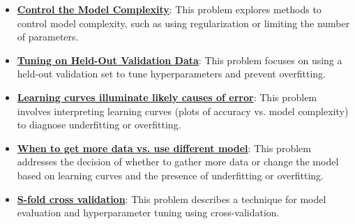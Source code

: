 \documentclass{article}%
\begin{document}
\begin{itemize}[leftmargin=*]
\item \href{https://purdue.brightspace.com/d2l/common/assets/pdfjs-d2l-dist/1.0.14-legacy/web/viewer.html?file=\%2Fcontent\%2Fenforced\%2F1095467-wl.202510.CS.24300.001\%2F10L1-CrossValidation.pdf\%3Fou\%3D1095467\&lang=en-us\&container=d2l-fileviewer-rendered-pdf\&fullscreen=d2l-fileviewer-rendered-pdf-dialog\&height=667#page=16}{\textbf{Control the Model Complexity}}: This problem explores methods to control model complexity, such as using regularization or limiting the number of parameters.%
\item \href{https://purdue.brightspace.com/d2l/common/assets/pdfjs-d2l-dist/1.0.14-legacy/web/viewer.html?file=\%2Fcontent\%2Fenforced\%2F1095467-wl.202510.CS.24300.001\%2F10L1-CrossValidation.pdf\%3Fou\%3D1095467\&lang=en-us\&container=d2l-fileviewer-rendered-pdf\&fullscreen=d2l-fileviewer-rendered-pdf-dialog\&height=667#page=19}{\textbf{Tuning on Held-Out Validation Data}}: This problem focuses on using a held-out validation set to tune hyperparameters and prevent overfitting.%
\item \href{https://purdue.brightspace.com/d2l/common/assets/pdfjs-d2l-dist/1.0.14-legacy/web/viewer.html?file=\%2Fcontent\%2Fenforced\%2F1095467-wl.202510.CS.24300.001\%2F10L1-CrossValidation.pdf\%3Fou\%3D1095467\&lang=en-us\&container=d2l-fileviewer-rendered-pdf\&fullscreen=d2l-fileviewer-rendered-pdf-dialog\&height=667#page=20}{\textbf{Learning curves illuminate likely causes of error}}: This problem involves interpreting learning curves (plots of accuracy vs. model complexity) to diagnose underfitting or overfitting.%
\item \href{https://purdue.brightspace.com/d2l/common/assets/pdfjs-d2l-dist/1.0.14-legacy/web/viewer.html?file=\%2Fcontent\%2Fenforced\%2F1095467-wl.202510.CS.24300.001\%2F10L1-CrossValidation.pdf\%3Fou\%3D1095467\&lang=en-us\&container=d2l-fileviewer-rendered-pdf\&fullscreen=d2l-fileviewer-rendered-pdf-dialog\&height=667#page=21}{\textbf{When to get more data vs. use different model}}: This problem addresses the decision of whether to gather more data or change the model based on learning curves and the presence of underfitting or overfitting.%
\item \href{https://purdue.brightspace.com/d2l/common/assets/pdfjs-d2l-dist/1.0.14-legacy/web/viewer.html?file=\%2Fcontent\%2Fenforced\%2F1095467-wl.202510.CS.24300.001\%2F10L1-CrossValidation.pdf\%3Fou\%3D1095467\&lang=en-us\&container=d2l-fileviewer-rendered-pdf\&fullscreen=d2l-fileviewer-rendered-pdf-dialog\&height=667#page=25}{\textbf{S-fold cross validation}}: This problem describes a technique for model evaluation and hyperparameter tuning using cross-validation.%

\end{itemize}
\end{document}
